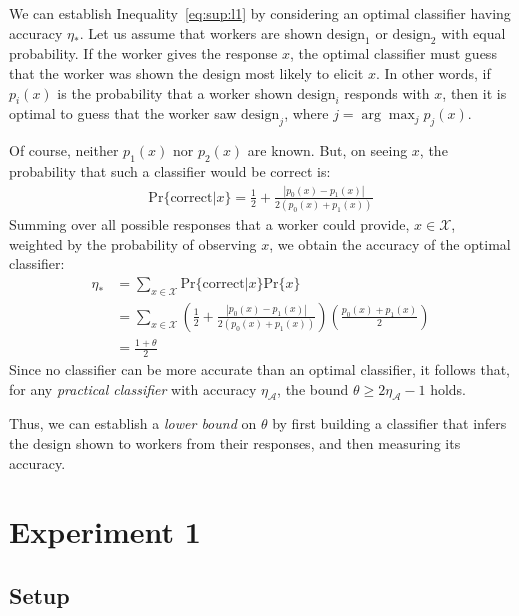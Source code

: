 \documentclass{sigchi}
\begin{document}
We can establish Inequality~\ref{eq:sup:l1} by considering an
optimal classifier having accuracy $\eta_*$.  
Let us assume that workers are shown 
$\mathrm{design}_1$ or $\mathrm{design}_2$ with equal probability.
If the worker gives the response $x$, the optimal classifier must guess
that the worker was shown the design most likely to elicit $x$.
In other words, if $p_i(x)$ is the probability that a worker shown 
$\mathrm{design}_i$ responds with $x$, then it is optimal to 
guess that the worker saw $\mathrm{design}_j$, where 
$j = \arg\max_j{p_j(x)}$.

Of course, neither $p_1(x)$ nor $p_2(x)$ are known.  But, on seeing $x$,
the probability that such a classifier would be correct is:
\begin{align}
  \mathrm{Pr}\{\mathrm{correct}|x\} = \frac{1}{2} 
	+ \frac{|p_0(x) - p_1(x)|}{2(p_0(x) + p_1(x))}
\end{align}
Summing over all possible responses that a worker could provide, 
$x \in \mathcal{X}$, weighted by the probability of observing $x$, 
we obtain the accuracy of the optimal classifier:
\begin{align}
\eta_* 
  &= \sum_{x\in\mathcal{X}} 
	\mathrm{Pr}\{\mathrm{correct}|x\}\mathrm{Pr}\{x\} \\
  &= \sum_{x\in\mathcal{X}} 
	\left(
	\frac{1}{2} + \frac{|p_0(x) - p_1(x)|}{2(p_0(x) + p_1(x))}
  \right) \left( 
	\frac{p_0(x) + p_1(x)}{2} 
  \right) \\
  &= \frac{1 + \theta}{2}
\end{align}
Since no classifier can be more accurate than an optimal classifier,
it follows that, for any \textit{practical classifier} 
with accuracy $\eta_\mathcal{A}$, the bound 
$\theta \geq 2\eta_\mathcal{A} -1$ holds.

Thus, we can establish a \textit{lower bound} on $\theta$ by first 
building a classifier that infers the design shown to workers from their 
responses, and then measuring its accuracy.

\section{Experiment 1}
\subsection{Setup}
\end{document}
